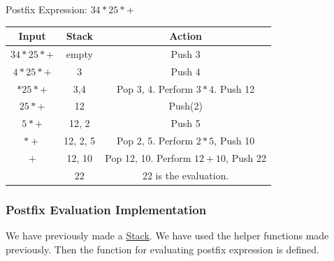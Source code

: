 \begin{eg}
  Postfix Expression: \(34*25*+\)
  \begin{table}[H]
    \centering
    \begin{tabular}{|c|c|c|}
      \hline
      Input&Stack&Action\\
      \hline
      \(34*25*+\)&empty&Push 3\\
      \(4*25*+\)&3&Push 4\\
      \(*25*+\)&3,4& Pop 3, 4. Perform \(3*4\). Push 12\\
      \(25*+\)&12&Push(2)\\
      \(5*+\)&12, 2& Push 5\\
      \(*+\)&12, 2, 5&Pop 2, 5. Perform \(2*5\), Push 10\\
      \(+\)&12, 10&Pop 12, 10. Perform \(12+10\), Push 22\\
           &22&22 is the evaluation.\\
           \hline
    \end{tabular}
  \end{table}
\end{eg}

\subsubsection{Postfix Evaluation Implementation}
We have previously made a \href{sec:stack-impl}{Stack}. We have used the helper
functions made previously. Then the function for evaluating postfix expression is defined.

\begin{listing}[H]
  \inputminted{python}{Code/eval_postfix.py}
  \caption{Postfix Evaluation}
  \label{lst:postfix-eval}
\end{listing}
